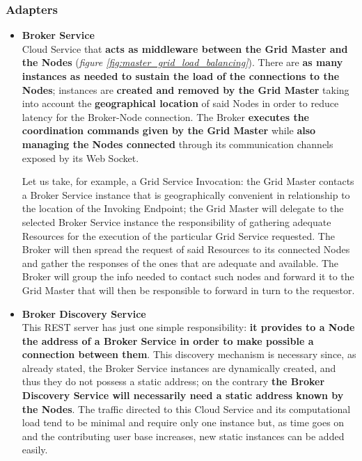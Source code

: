 \subsubsection{Adapters}
\begin{itemize}
    \item \textbf{Broker Service}\\
    Cloud Service that \textbf{acts as middleware between the Grid Master and the Nodes} (\textit{figure \ref{fig:master_grid_load_balancing}}). There are \textbf{as many instances as needed to sustain the load of the connections to the Nodes}; instances are \textbf{created and removed by the Grid Master} taking into account the \textbf{geographical location} of said Nodes in order to reduce latency for the Broker-Node connection.
    The Broker \textbf{executes the coordination commands given by the Grid Master} while \textbf{also managing the Nodes connected} through its communication channels exposed by its Web Socket.
    
    Let us take, for example, a Grid Service Invocation: the Grid Master contacts a Broker Service instance that is geographically convenient in relationship to the location of the Invoking Endpoint; the Grid Master will delegate to the selected Broker Service instance the responsibility of gathering adequate Resources for the execution of the particular Grid Service requested. The Broker will then spread the request of said Resources to its connected Nodes and gather the responses of the ones that are adequate and available. The Broker will group the info needed to contact such nodes and forward it to the Grid Master that will then be responsible to forward in turn to the requestor.

    \item \textbf{Broker Discovery Service}\\
    This REST server has just one simple responsibility: \textbf{it provides to a Node the address of a Broker Service in order to make possible a connection between them}. This discovery mechanism is necessary since, as already stated, the Broker Service instances are dynamically created, and thus they do not possess a static address; on the contrary \textbf{the Broker Discovery Service will necessarily need a static address known by the Nodes}. The traffic directed to this Cloud Service and its computational load tend to be minimal and require only one instance but, as time goes on and the contributing user base increases, new static instances can be added easily.


\end{itemize}
